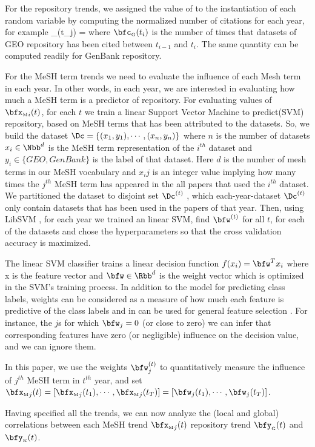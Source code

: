 \documentclass[twoside,11pt]{article}
\def\bfyg{\bfy_{\text{\tiny G}}}
\def\bfyk{\bfy_{\text{\tiny K}}}
\def\bfxm{{\bfx_{\text{\tiny M}}}}
\begin{document}
For the repository trends, we assigned the value of to the instantiation of each random variable by computing the normalized number of citations for each year, for example
\beq
\bfyg(t_j) = 
\eeq
where $\bfc_{\text{\tiny G}}(t_i)$ is the number of times that datasets of GEO repository has been cited between $t_{i-1}$ and $t_i$. The same quantity can be computed readily for GenBank repository.

For the MeSH term trends we need to evaluate the influence of each Mesh term in each year. In other words, in each year, we are interested in evaluating how much a  MeSH term is a predictor of repository. For evaluating values of $\bfxm_i(t)$, for each $t$ we train a linear Support Vector Machine to predict(SVM) \cite{SVN} repository, based on MeSH terms that has been attributed to the datasets. So, we build the dataset $\Dc=\{(x_1,y_1), \cdots , (x_n,y_n) \}$ where $n$ is the number of datasets $x_i\in\Nbb^d$ is the MeSH term representation of the $i^{th}$ dataset and $y_i\in \{GEO,GenBank\}$ is the label of that dataset. Here $d$ is the number of mesh terms in our MeSH vocabulary and $x_ij$ is an integer value implying how many times the $j^{th}$ MeSH term has appeared in the all papers that used the $i^{th}$ dataset. We partitioned the dataset to disjoint set $\Dc^{(t)}$ , which each-year-dataset $\Dc^{(t)}$ only contain datasets that has been used in the papers of that year. Then, using LibSVM \cite{libsvm}, for each  year we trained an linear SVM, find $\bfw^{(t)}$ for all $t$, for each of the datasets and chose the hyperparameters so that the cross validation accuracy is maximized. 

The linear SVM classifier trains a linear decision function $f(x_i)=\bfw^T x_i$ where x is the feature vector and $\bfw \in \Rbb^d$ is the weight vector which is optimized in the SVM's training process. In addition to the model for predicting class labels, weights can be considered as a measure of how much each feature is predictive of the class labels and in can be used for general feature selection \cite{Guyon03}. For instance, the $j$s for which $\bfw_j=0$ (or close to zero) we can infer that corresponding features have zero (or negligible) influence on the decision value, and we can ignore them. 

In this paper, we use the weights $\bfw_j^{(t)}$ to quantitatively measure the influence of $j^{th}$ MeSH term in $t^{th}$ year, and set $\bfxm_j (t) = [\bfxm_j(t_1), \cdots, \bfxm_j(t_T) ] = [\bfw_j(t_1), \cdots, \bfw_j(t_T) ]$.

Having specified all the trends, we can now analyze the (local and global) correlations between each MeSH trend $\bfxm_j(t)$ repository trend $\bfyg(t)$ and $\bfyk(t)$. 




\end{document}
